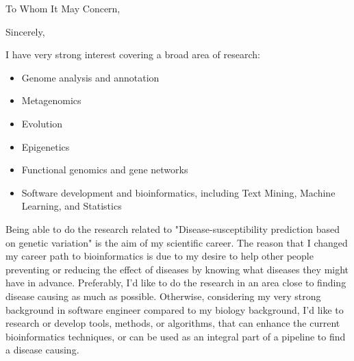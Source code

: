 \documentclass{application}
\begin{document}

\SectionPersonalInfo
\SectionProfessionalExperience
\SectionEducation
\SectionMasterThesis
\SectionPublication
\SectionReferees

\date{November 17, 2012}
\opening{To Whom It May Concern,}
\closing{Sincerely,}

I have very strong interest covering a broad area of research: 
\begin{itemize}[parsep=0pt,partopsep=0pt,topsep=0pt,itemsep=0mm,itemindent=1mm]
    \item{Genome analysis and annotation}
    \item{Metagenomics}
    \item{Evolution}
    \item{Epigenetics}
    \item{Functional genomics and gene networks}
    \item{Software development and bioinformatics, including Text Mining, Machine Learning, and Statistics}
\end{itemize}

\addvspace{3mm}
Being able to do the research related to "Disease-susceptibility prediction based on genetic variation" is the aim of my scientific career. The reason that I changed my career path to bioinformatics is due to my desire to help other people preventing or reducing the effect of diseases by knowing what diseases they might have in advance. Preferably, I'd like to do the research in an area close to finding disease causing as much as possible. Otherwise, considering my very strong background in software engineer compared to my biology background, I'd like to research or develop tools, methods, or algorithms, that can enhance the current bioinformatics techniques, or can be used as an integral part of a pipeline to find a disease causing.



\MakeLetterClosing
\end{document}
